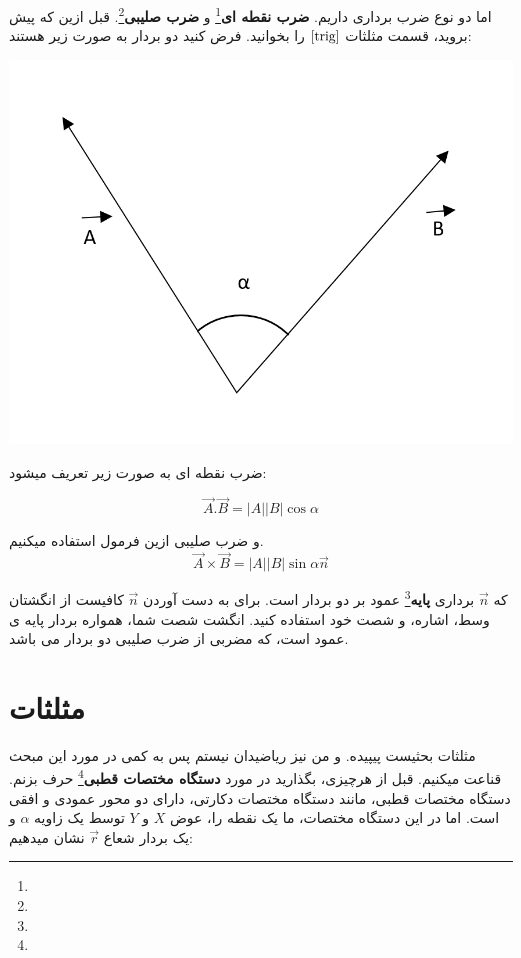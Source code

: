 \documentclass[14pt,a4paper]{memoir}
\begin{document}
	 
	 
	 اما دو نوع ضرب برداری داریم. \textbf{ضرب نقطه ای}\footnote{} و \textbf{ضرب صلیبی}\footnote{}. قبل ازین که پیش بروید، قسمت مثلثات \(\ref{trig}\) را بخوانید. فرض کنید دو بردار به صورت زیر هستند:
	 
	 
	  \begin{center}
	 	\includegraphics[scale=0.3]{Product}
	 \end{center}
	 
	 
	 ضرب نقطه ای به صورت زیر تعریف میشود:
	 
	 \[ \vec{A}.\vec{B} = |A||B|\cos \alpha \]
	 
	 و ضرب صلیبی ازین فرمول استفاده میکنیم.
	 \[ \vec{A} \times \vec{B} = |A||B|\sin \alpha \vec{n} \]
	 
	 
	 که  $\vec{n} $ برداری \textbf{پایه}\footnote{}  عمود بر دو بردار است. برای به دست آوردن $\vec{n}$ کافیست از انگشتان وسط، اشاره، و شصت خود استفاده کنید. انگشت شصت شما، همواره بردار پایه ی عمود است، که مضربی از ضرب صلیبی دو بردار می باشد.
	 
	 
	 \section{مثلثات}\label{trig}
	 
	 مثلثات بحثیست پیپیده. و من نیز ریاضیدان نیستم پس به کمی در مورد این مبحث قناعت میکنیم.  قبل از هرچیزی، بگذارید در مورد \textbf{دستگاه مختصات قطبی}\footnote{} حرف بزنم. دستگاه مختصات قطبی، مانند دستگاه مختصات دکارتی، دارای دو محور عمودی و افقی است. اما در این دستگاه مختصات، ما یک نقطه را، عوض $ X $ و $ Y $ توسط یک زاویه $ \alpha $ و یک بردار شعاع $ \vec{r} $ نشان میدهیم:
	 
\end{document}
